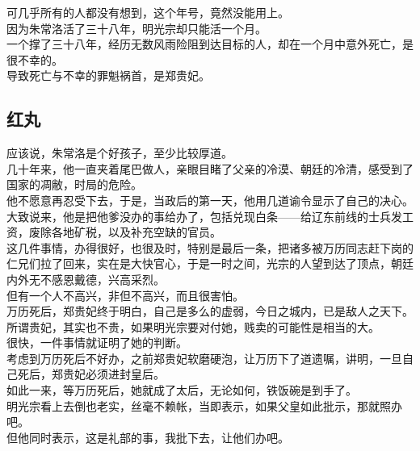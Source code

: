\begin{multicols}{\theparacolNo}
可几乎所有的人都没有想到，这个年号，竟然没能用上。\\

因为朱常洛活了三十八年，明光宗却只能活一个月。\\

一个撑了三十八年，经历无数风雨险阻到达目标的人，却在一个月中意外死亡，是很不幸的。\\

导致死亡与不幸的罪魁祸首，是郑贵妃。\\

\subsection{红丸}
应该说，朱常洛是个好孩子，至少比较厚道。\\

几十年来，他一直夹着尾巴做人，亲眼目睹了父亲的冷漠、朝廷的冷清，感受到了国家的凋敝，时局的危险。\\

他不愿意再忍受下去，于是，当政后的第一天，他用几道谕令显示了自己的决心。\\

大致说来，他是把他爹没办的事给办了，包括兑现白条——给辽东前线的士兵发工资，废除各地矿税，以及补充空缺的官员。\\

这几件事情，办得很好，也很及时，特别是最后一条，把诸多被万历同志赶下岗的仁兄们拉了回来，实在是大快官心，于是一时之间，光宗的人望到达了顶点，朝廷内外无不感恩戴德，兴高采烈。\\

但有一个人不高兴，非但不高兴，而且很害怕。\\

万历死后，郑贵妃终于明白，自己是多么的虚弱，今日之城内，已是敌人之天下。所谓贵妃，其实也不贵，如果明光宗要对付她，贱卖的可能性是相当的大。\\

很快，一件事情就证明了她的判断。\\

考虑到万历死后不好办，之前郑贵妃软磨硬泡，让万历下了道遗嘱，讲明，一旦自己死后，郑贵妃必须进封皇后。\\

如此一来，等万历死后，她就成了太后，无论如何，铁饭碗是到手了。\\

明光宗看上去倒也老实，丝毫不赖帐，当即表示，如果父皇如此批示，那就照办吧。\\

但他同时表示，这是礼部的事，我批下去，让他们办吧。\\


\end{multicols}
